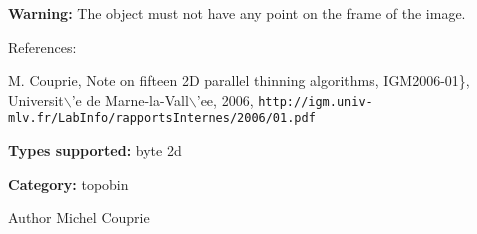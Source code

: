 {\bfseries Warning:} The object must not have any point on the frame of the image.

References:\par
 [COU05] M. Couprie, Note on fifteen 2D parallel thinning algorithms, IGM2006-\/01\}, Universit$\backslash$'e de Marne-\/la-\/Vall$\backslash$'ee, 2006, {\tt http://igm.univ-\/mlv.fr/LabInfo/rapportsInternes/2006/01.pdf}\par


{\bfseries Types supported:} byte 2d

{\bfseries Category:} topobin

\begin{DoxyAuthor}{Author}
Michel Couprie 
\end{DoxyAuthor}
